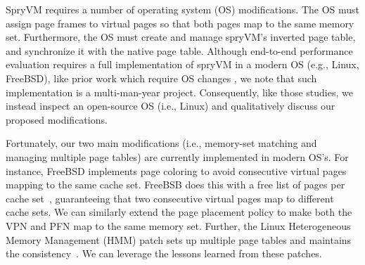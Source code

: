 
SpryVM requires a number of operating system (OS) modifications. The OS must assign page frames to virtual pages so that both pages map to the same memory set. Furthermore, the OS must create and manage spryVM's inverted page table, and synchronize it with the native page table. Although end-to-end performance evaluation requires a full implementation of spryVM in a modern OS (e.g., Linux, FreeBSD), like prior work which require OS changes \cite{talluri:surpassing, talluri:tradeoffs, talluri:pagetable}, we note that such implementation is a multi-man-year project. Consequently, like those studies, we instead inspect an open-source OS (i.e., Linux) and qualitatively discuss our proposed modifications.  

Fortunately, our two main modifications (i.e., memory-set matching and managing multiple page tables) are currently implemented in modern OS's. For instance, FreeBSD implements page coloring to avoid consecutive virtual pages mapping to the same cache set. FreeBSB does this with a free list of pages per cache set~\cite{mckusick:design}, guaranteeing that two consecutive virtual pages map to different cache sets. We can similarly extend the page placement policy to make both the VPN and PFN map to the same memory set. Further, the Linux Heterogeneous Memory Management (HMM) patch sets up multiple page tables and maintains the consistency~\cite{glisse:hmm}. We can leverage the lessons learned from these patches.

